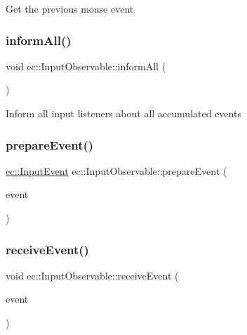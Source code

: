 Get the previous mouse event \mbox{\label{classec_1_1_input_observable_ac8ac61eaebb95010e8a12bb1e6348391}} 
\subsubsection{\texorpdfstring{inform\+All()}{informAll()}}
{\footnotesize\ttfamily void ec\+::\+Input\+Observable\+::inform\+All (\begin{DoxyParamCaption}{ }\end{DoxyParamCaption})\hspace{0.3cm}{\ttfamily [virtual]}}

Inform all input listeners about all accumulated events \mbox{\label{classec_1_1_input_observable_a7aaa88f25dd3d8902bc6767240c83ecf}} 
\subsubsection{\texorpdfstring{prepare\+Event()}{prepareEvent()}}
{\footnotesize\ttfamily \mbox{\hyperlink{structec_1_1_input_event}{ec\+::\+Input\+Event}} ec\+::\+Input\+Observable\+::prepare\+Event (\begin{DoxyParamCaption}\item[{const \mbox{\hyperlink{structec_1_1_input_event}{Input\+Event}} \&}]{event }\end{DoxyParamCaption})\hspace{0.3cm}{\ttfamily [protected]}}

\mbox{\label{classec_1_1_input_observable_ac35d29f643a2735e4cb38cb6ee1354aa}} 
\subsubsection{\texorpdfstring{receive\+Event()}{receiveEvent()}}
{\footnotesize\ttfamily void ec\+::\+Input\+Observable\+::receive\+Event (\begin{DoxyParamCaption}\item[{const \mbox{\hyperlink{structec_1_1_input_event}{Input\+Event}} \&}]{event }\end{DoxyParamCaption})\hspace{0.3cm}{\ttfamily [virtual]}}

